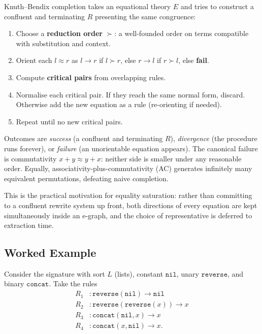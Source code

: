 \documentclass[11pt,a4paper]{article}
\begin{document}
Knuth--Bendix completion \citep{knuth1970simple} takes an equational theory $E$ and tries to construct a confluent and terminating $R$ presenting the same congruence:
\begin{enumerate}
\item Choose a \textbf{reduction order} $\succ$: a well-founded order on terms compatible with substitution and context.
\item Orient each $l \approx r$ as $l \to r$ if $l \succ r$, else $r \to l$ if $r \succ l$, else \textbf{fail}.
\item Compute \textbf{critical pairs} from overlapping rules.
\item Normalise each critical pair. If they reach the same normal form, discard. Otherwise add the new equation as a rule (re-orienting if needed).
\item Repeat until no new critical pairs.
\end{enumerate}

Outcomes are \emph{success} (a confluent and terminating $R$), \emph{divergence} (the procedure runs forever), or \emph{failure} (an unorientable equation appears). The canonical failure is commutativity $x + y \approx y + x$: neither side is smaller under any reasonable order. Equally, associativity-plus-commutativity (AC) generates infinitely many equivalent permutations, defeating naive completion.

This is the practical motivation for equality saturation: rather than committing to a confluent rewrite system up front, both directions of every equation are kept simultaneously inside an e-graph, and the choice of representative is deferred to extraction time.

\subsection{Worked Example}\label{sec:reverse-concat-example}

Consider the signature with sort $L$ (lists), constant $\mathtt{nil}$, unary $\mathtt{reverse}$, and binary $\mathtt{concat}$. Take the rules
\begin{align*}
R_1 &: \mathtt{reverse}(\mathtt{nil}) \to \mathtt{nil} \\
R_2 &: \mathtt{reverse}(\mathtt{reverse}(x)) \to x \\
R_3 &: \mathtt{concat}(\mathtt{nil}, x) \to x \\
R_4 &: \mathtt{concat}(x, \mathtt{nil}) \to x.
\end{align*}
\end{document}

